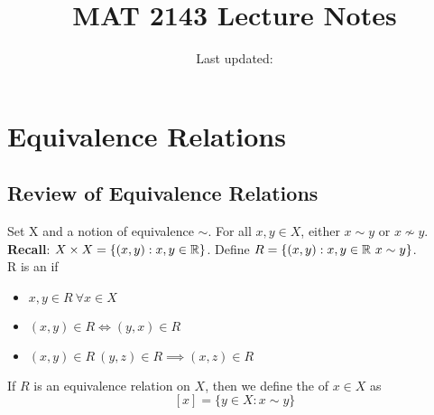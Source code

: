 \documentclass[openany]{report}
\title{MAT 2143 Lecture Notes}
\author{Last updated:}
\begin{document}
\maketitle

\tableofcontents

\chapter{Equivalence Relations}
\section{Review of Equivalence Relations}
\onehalfspacing
Set X and a notion of equivalence $\sim$. For all $x,y \in X$, either $x \sim y$ or $x \not\sim y$.
\textbf{Recall}: $X \times X = \{(x,y): x,y \in \mathbb{R}\}$. Define $R = \{(x,y): x,y \in \mathbb{R} \ x \sim y \}$.\\[2ex]
R is an  if 
\begin{itemize}
    \item $x,y \in R \ \forall x \in X$
    \item $(x,y) \in R \iff (y,x) \in R$
    \item $(x,y) \in R \ (y,z) \in R \implies (x,z) \in R$
\end{itemize}
If $R$ is an equivalence relation on $X$, then we define the  of $x \in X$ as
$$[x] = \{y \in X: x \sim y\}$$
\end{document}
